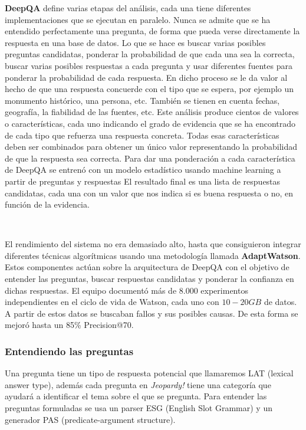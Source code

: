 \documentclass[paper=a4, fontsize=10pt]{scrartcl} %
\numberwithin{equation}{section} %
\numberwithin{figure}{section} %
\numberwithin{table}{section} %
\begin{document}
\textbf{DeepQA} define varias etapas del análisis, cada una tiene diferentes implementaciones que se ejecutan en paralelo.  
Nunca se admite que se ha entendido perfectamente una pregunta, de forma que pueda verse directamente la respuesta en una base de datos.
Lo que se hace es buscar varias posibles preguntas candidatas, ponderar la probabilidad de que cada una sea la correcta, buscar varias posibles respuestas a cada pregunta y usar diferentes fuentes para ponderar la probabilidad de cada respuesta.
En dicho proceso se le da valor al hecho de que una respuesta concuerde con el tipo que se espera, por ejemplo un monumento histórico, una persona, etc.
También se tienen en cuenta fechas, geografía, la fiabilidad de las fuentes, etc.
Este análisis produce cientos de valores o características, cada uno indicando el grado de evidencia que se ha encontrado de cada tipo que refuerza una respuesta concreta.
Todas esas características deben ser combinados para obtener un único valor representando la probabilidad de que la respuesta sea correcta.
Para dar una ponderación a cada característica de DeepQA se entrenó con un modelo estadístico usando machine learning a partir de preguntas y respuestas
El resultado final es una lista de respuestas candidatas, cada una con un valor que nos indica si es buena respuesta o no, en función de la evidencia.

\

El rendimiento del sistema no era demasiado alto, hasta que consiguieron integrar diferentes técnicas algorítmicas usando una metodología llamada \textbf{AdaptWatson}.
Estos componentes actúan sobre la arquitectura de DeepQA con el objetivo de entender las preguntas, buscar respuestas candidatas y ponderar la confianza en dichas respuestas.
El equipo documentó más de $8.000$ experimentos independientes en el ciclo de vida de Watson, cada uno con $10-20GB$ de datos.
A partir de estos datos se buscaban fallos y sus posibles causas.
De esta forma se mejoró hasta un 85\% Precision@70.

\subsubsection{Entendiendo las preguntas}
Una pregunta tiene un tipo de respuesta potencial que llamaremos LAT (lexical answer type), además cada pregunta en \textit{Jeopardy!} tiene una categoría que ayudará a identificar el tema sobre el que se pregunta. %
Para entender las preguntas formuladas se usa un parser ESG (English Slot Grammar) %
y un generador PAS (predicate-argument structure). 
\end{document}
